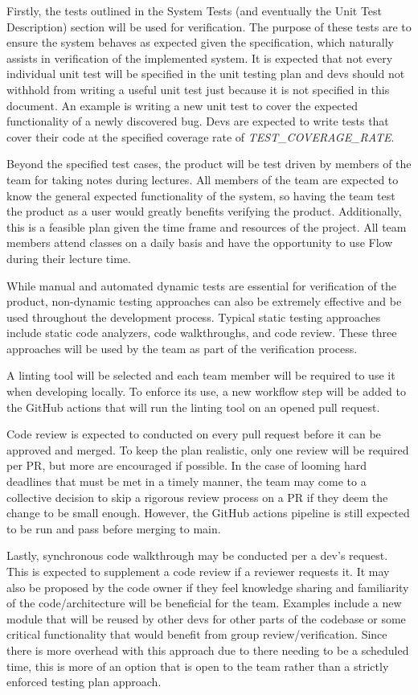 \documentclass[12pt, titlepage]{article}
\begin{document}
Firstly, the tests outlined in the System Tests (and eventually the Unit Test
Description) section will be used for verification. The purpose of these tests
are to ensure the system behaves as expected given the specification, which
naturally assists in verification of the implemented system. It is expected
that not every individual unit test will be specified in the unit testing plan
and devs should not withhold from writing a useful unit test just because it is
not specified in this document. An example is writing a new unit test to cover
the expected functionality of a newly discovered bug. Devs are expected to
write tests that cover their code at the specified coverage rate of
\textit{TEST\_COVERAGE\_RATE}.

Beyond the specified test cases, the product will be test driven by members
of the team for taking notes during lectures. All members of the team are
expected to know the general expected functionality of the system, so having
the team test the product as a user would greatly benefits verifying the
product. Additionally, this is a feasible plan given the time frame and
resources of the project. All team members attend classes on a daily basis and
have the opportunity to use Flow during their lecture time.

While manual and automated dynamic tests are essential for verification of the
product, non-dynamic testing approaches can also be extremely effective and be
used throughout the development process. Typical static testing approaches
include static code analyzers, code walkthroughs, and code review. These three
approaches will be used by the team as part of the verification process.

A linting tool will be selected and each team member will be required to use it
when developing locally. To enforce its use, a new workflow step will be added
to the GitHub actions that will run the linting tool on an opened pull request.

Code review is expected to conducted on every pull request before it can be
approved and merged. To keep the plan realistic, only one review will be
required per PR, but more are encouraged if possible. In the case of looming
hard deadlines that must be met in a timely manner, the team may come to a
collective decision to skip a rigorous review process on a PR if they deem the
change to be small enough. However, the GitHub actions pipeline is still
expected to be run and pass before merging to main.

Lastly, synchronous code walkthrough may be conducted per a dev's request. This
is expected to supplement a code review if a reviewer requests it. It may also
be proposed by the code owner if they feel knowledge sharing and familiarity of
the code/architecture will be beneficial for the team. Examples include a new
module that will be reused by other devs for other parts of the codebase or
some critical functionality that would benefit from group review/verification.
Since there is more overhead with this approach due to there needing to be a
scheduled time, this is more of an option that is open to the team rather than
a strictly enforced testing plan approach.
\end{document}

